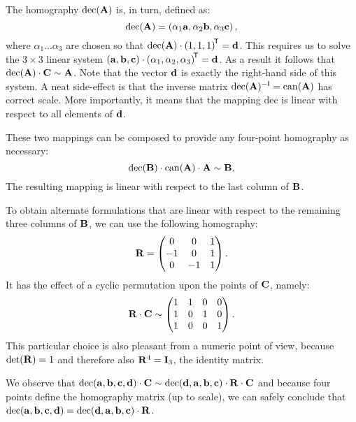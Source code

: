 The homography $\mathrm{dec}(\mathbf{A})$ is, in turn, defined as:
$$\mathrm{dec}(\mathbf{A}) = \left( \alpha_1 \mathbf{a}, \alpha_2 \mathbf{b}, \alpha_3 \mathbf{c} \right),$$
where $\alpha_1 \dots \alpha_3$ are chosen so that $\mathrm{dec}(\mathbf{A}) \cdot \left( 1, 1, 1 \right)^{\!\mathsf{T}} = \mathbf{d}$.
This requires us to solve the $3 \times 3$ linear system $\left(\mathbf{a}, \mathbf{b}, \mathbf{c} \right) \cdot \left(\alpha_1, \alpha_2, \alpha_3 \right) ^{\!\mathsf{T}} = \mathbf{d}$.
As a result it follows that $\mathrm{dec}(\mathbf{A}) \cdot \mathbf{C} \sim \mathbf{A}$.
Note that the vector $\mathbf{d}$ is exactly the right-hand side of this system.
A neat side-effect is that the inverse matrix $\mathrm{dec}(\mathbf{A}) ^{-\mathsf{I}} = \mathrm{can}(\mathbf{A})$ has correct scale. 
More importantly, it means that the mapping $\mathrm{dec}$ is linear with respect to all elements of $\mathbf{d}$.

These two mappings can be composed to provide any four-point homography as necessary:
$$\mathrm{dec}(\mathbf{B}) \cdot \mathrm{can}(\mathbf{A}) \cdot \mathbf{A} \sim \mathbf{B}.$$
The resulting mapping is linear with respect to the last column of $\mathbf{B}$.

To obtain alternate formulations that are linear with respect to the remaining three columns of $\mathbf{B}$, we can use the following homography:
$$\mathbf{R} = \begin{pmatrix}
 0 & 0 & 1 \\
 -1 & 0 & 1 \\
 0 & -1 & 1
 \end{pmatrix}.$$
It has the effect of a cyclic permutation upon the points of $\mathbf{C}$, namely:
$$\mathbf{R} \cdot \mathbf{C} \sim \begin{pmatrix}
 1 & 1 & 0 & 0 \\
 1 & 0 & 1 & 0 \\
 1 & 0 & 0 & 1
 \end{pmatrix}.$$
This particular choice is also pleasant from a numeric point of view, because $\mathrm{det}(\mathbf{R}) = 1$ and therefore also $\mathbf{R}^4 = \mathbf{I}_3$, the identity matrix.

We observe that $\mathrm{dec}(\mathbf{a}, \mathbf{b}, \mathbf{c}, \mathbf{d}) \cdot \mathbf{C} \sim \mathrm{dec}(\mathbf{d}, \mathbf{a}, \mathbf{b}, \mathbf{c}) \cdot \mathbf{R} \cdot \mathbf{C}$ and because four points define the homography matrix (up to scale), we can safely conclude that $\mathrm{dec}(\mathbf{a}, \mathbf{b}, \mathbf{c}, \mathbf{d}) = \mathrm{dec}(\mathbf{d}, \mathbf{a}, \mathbf{b}, \mathbf{c}) \cdot \mathbf{R}$.


